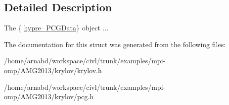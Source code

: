 \subsection{Detailed Description}
The \{ \hyperlink{structhypre__PCGData}{hypre\+\_\+\+P\+C\+G\+Data}\} object ... 

The documentation for this struct was generated from the following files\+:\begin{DoxyCompactItemize}
\item 
/home/arnabd/workspace/civl/trunk/examples/mpi-\/omp/\+A\+M\+G2013/krylov/krylov.\+h\item 
/home/arnabd/workspace/civl/trunk/examples/mpi-\/omp/\+A\+M\+G2013/krylov/pcg.\+h\end{DoxyCompactItemize}

